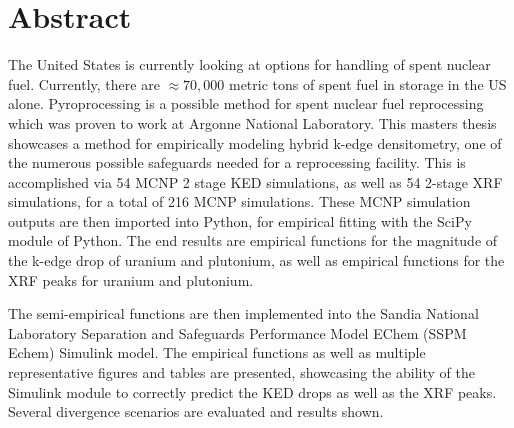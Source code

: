 \chapter*{Abstract}\label{ch:abstract}
The United States is currently looking at options for handling of spent nuclear fuel. Currently, there are $\approx 70,000$ metric tons of spent fuel in storage in the US alone. Pyroprocessing is a possible method for spent nuclear fuel reprocessing which was proven to work at Argonne National Laboratory. This masters thesis showcases a method for empirically modeling hybrid k-edge densitometry, one of the numerous possible safeguards needed for a reprocessing facility. This is accomplished via 54 MCNP 2 stage KED simulations, as well as 54 2-stage XRF simulations, for a total of 216 MCNP simulations. These MCNP simulation outputs are then imported into Python, for empirical fitting with the SciPy module of Python. The end results are empirical functions for the magnitude of the k-edge drop of uranium and plutonium, as well as empirical functions for the XRF peaks for uranium and plutonium.

The semi-empirical functions are then implemented into the Sandia National Laboratory Separation and Safeguards Performance Model EChem (SSPM Echem) Simulink model. The empirical functions as well as multiple representative figures and tables are presented, showcasing the ability of the Simulink module to correctly predict the KED drops as well as the XRF peaks. Several divergence scenarios are evaluated and results shown.